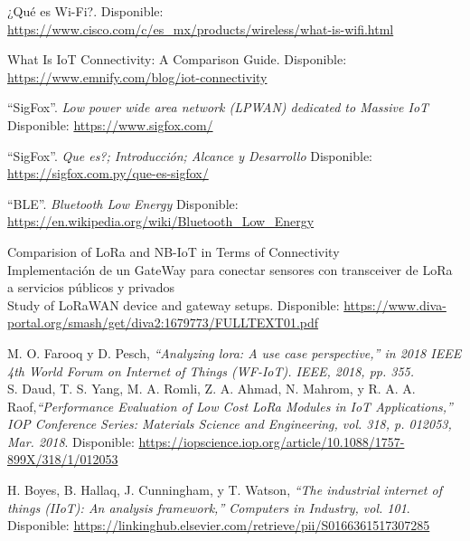 \begin{references}
    ¿Qué es Wi-Fi?. Disponible:
    \url{https://www.cisco.com/c/es_mx/products/wireless/what-is-wifi.html}

    What Is IoT Connectivity: A Comparison Guide. Disponible:
    \url{https://www.emnify.com/blog/iot-connectivity}

    “SigFox”. \textit{Low power wide area network (LPWAN) dedicated to Massive IoT} Disponible: \url{https://www.sigfox.com/}

    “SigFox”. \textit{Que es?; Introducción; Alcance y Desarrollo} Disponible: \url{https://sigfox.com.py/que-es-sigfox/}

    “BLE”. \textit{Bluetooth Low Energy} Disponible: \url{https://en.wikipedia.org/wiki/Bluetooth_Low_Energy}

    Comparision of LoRa and NB-IoT in Terms of Connectivity\\

    Implementación de un GateWay para conectar sensores con transceiver de LoRa a servicios públicos y privados\\

    Study of LoRaWAN device and gateway setups. Disponible:
    \url{https://www.diva-portal.org/smash/get/diva2:1679773/FULLTEXT01.pdf}

    M. O. Farooq y D. Pesch, \textit{“Analyzing lora: A use case perspective,” in 2018 IEEE 4th World Forum on
        Internet of Things (WF-IoT). IEEE, 2018, pp. 355.}\\

    S. Daud, T. S. Yang, M. A. Romli, Z. A. Ahmad, N. Mahrom, y R. A. A. Raof,\textit{“Performance Evaluation of Low Cost LoRa Modules in IoT Applications,” IOP Conference Series:
        Materials Science and Engineering, vol. 318, p. 012053, Mar. 2018}. Disponible:
    \url{https://iopscience.iop.org/article/10.1088/1757-899X/318/1/012053}

    H. Boyes, B. Hallaq, J. Cunningham, y T. Watson, \textit{“The industrial internet of things (IIoT): An
        analysis framework,” Computers in Industry, vol. 101}. Disponible:
    \url{https://linkinghub.elsevier.com/retrieve/pii/S0166361517307285}



\end{references}
